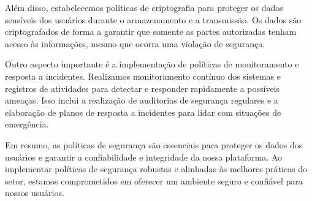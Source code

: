 Além disso, estabelecemos políticas de criptografia para proteger os dados sensíveis dos usuários durante o armazenamento e a transmissão. Os dados são criptografados de forma a garantir que somente as partes autorizadas tenham acesso às informações, mesmo que ocorra uma violação de segurança.

Outro aspecto importante é a implementação de políticas de monitoramento e resposta a incidentes. Realizamos monitoramento contínuo dos sistemas e registros de atividades para detectar e responder rapidamente a possíveis ameaças. Isso inclui a realização de auditorias de segurança regulares e a elaboração de planos de resposta a incidentes para lidar com situações de emergência.

Em resumo, as políticas de segurança são essenciais para proteger os dados dos usuários e garantir a confiabilidade e integridade da nossa plataforma. Ao implementar políticas de segurança robustas e alinhadas às melhores práticas do setor, estamos comprometidos em oferecer um ambiente seguro e confiável para nossos usuários.